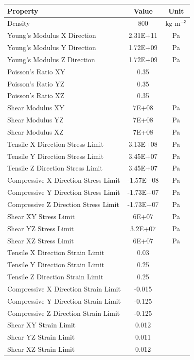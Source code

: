 \begin{table}[htp]
    \centering
    \begin{tabular}{lcc}
        Property & Value & Unit \\ \hline
        
        Density & 800 & kg m$^{-3}$\\ 
        
        Young's Modulus X Direction & 2.31E+11 & Pa\\
        Young's Modulus Y Direction & 1.72E+09 & Pa\\
        Young's Modulus Z Direction & 1.72E+09 & Pa\\
        Poisson's Ratio XY & 0.35 &\\
        Poisson's Ratio YZ & 0.35 &\\
        Poisson's Ratio XZ & 0.35 &\\
        Shear Modulus XY & 7E+08 & Pa\\
        Shear Modulus YZ & 7E+08 & Pa\\
        Shear Modulus XZ & 7E+08 & Pa\\
        
        Tensile X Direction Stress Limit & 3.13E+08 & Pa\\
        Tensile Y Direction Stress Limit & 3.45E+07 & Pa\\
        Tensile Z Direction Stress Limit & 3.45E+07 & Pa\\
        Compressive X Direction Stress Limit & -1.57E+08 & Pa\\
        Compressive Y Direction Stress Limit & -1.73E+07 & Pa\\
        Compressive Z Direction Stress Limit & -1.73E+07 & Pa\\
        Shear XY Stress Limit & 6E+07 & Pa\\
        Shear YZ Stress Limit & 3.2E+07 & Pa\\
        Shear XZ Stress Limit & 6E+07 & Pa\\
        
        Tensile X Direction Strain Limit & 0.03 &\\
        Tensile Y Direction Strain Limit & 0.25 &\\
        Tensile Z Direction Strain Limit & 0.25 &\\
        Compressive X Direction Strain Limit & -0.015&\\
        Compressive Y Direction Strain Limit & -0.125 &\\
        Compressive Z Direction Strain Limit & -0.125 &\\
        Shear XY Strain Limit & 0.012 &\\
        Shear YZ Strain Limit & 0.011 &\\
        Shear XZ Strain  Limit & 0.012 &\\  
        

\end{tabular}
\end{table}
